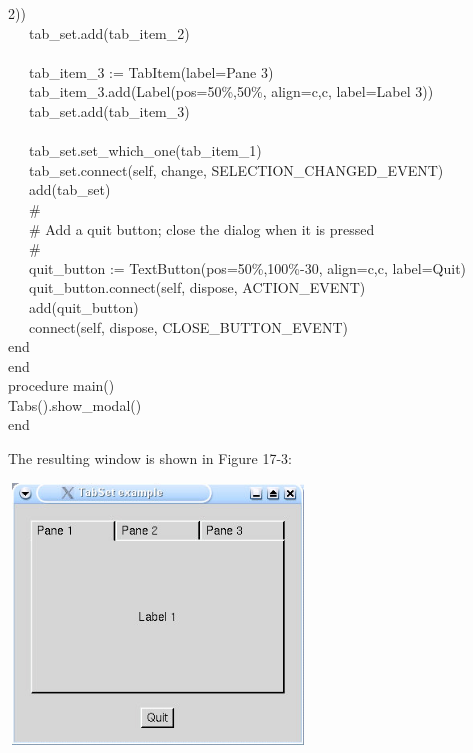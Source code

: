 {2{\textquotedbl})) \\
\>   \ \ \ tab\_set.add(tab\_item\_2) \\
\ \\
\>   \ \ \ tab\_item\_3 := TabItem({\textquotedbl}label=Pane
3{\textquotedbl}) \\
\>   \ \ \ tab\_item\_3.add(Label({\textquotedbl}pos=50\%,50\%{\textquotedbl},
{\textquotedbl}align=c,c{\textquotedbl}, {\textquotedbl}label=Label
3{\textquotedbl})) \\
\>   \ \ \ tab\_set.add(tab\_item\_3) \\
\ \\
\>   \ \ \ tab\_set.set\_which\_one(tab\_item\_1) \\
\>   \ \ \ tab\_set.connect(self, {\textquotedbl}change{\textquotedbl},
SELECTION\_CHANGED\_EVENT) \\
\>   \ \ \ add(tab\_set) \\
\>   \ \ \ \# \\
\>   \ \ \ \# Add a quit button; close the dialog when it is pressed \\
\>   \ \ \ \# \\
\>   \ \ \ quit\_button :=
TextButton({\textquotedbl}pos=50\%,100\%-30{\textquotedbl},
{\textquotedbl}align=c,c{\textquotedbl},
{\textquotedbl}label=Quit{\textquotedbl}) \\
\>   \ \ \ quit\_button.connect(self,
{\textquotedbl}dispose{\textquotedbl}, ACTION\_EVENT) \\
\>   \ \ \ add(quit\_button) \\
\>   \ \ \ connect(self, {\textquotedbl}dispose{\textquotedbl},
CLOSE\_BUTTON\_EVENT) \\
\>   end \\
end \\
procedure main() \\
\>   Tabs().show\_modal() \\
end
}


The resulting window is shown in Figure 17-3:

\begin{center}
\includegraphics[width=3.1272in,height=2.7299in]{ub-img/ub-img52.jpg}
\end{center}

